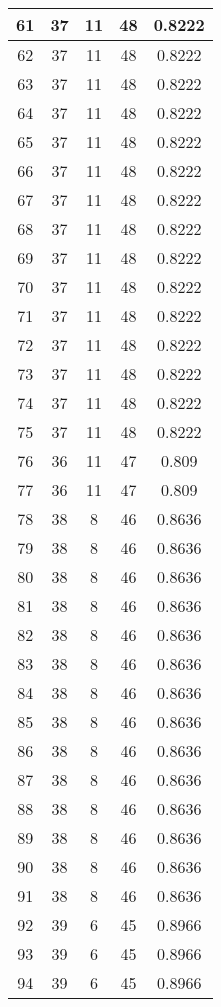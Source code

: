 \documentclass[letterpaper, 12pt]{article}
\begin{document}
\begin{longtable}{|c|c|c|c|c|}
\hline
61 & 37 & 11 & 48 & 0.8222 \\
\hline
62 & 37 & 11 & 48 & 0.8222 \\
\hline
63 & 37 & 11 & 48 & 0.8222 \\
\hline
64 & 37 & 11 & 48 & 0.8222 \\
\hline
65 & 37 & 11 & 48 & 0.8222 \\
\hline
66 & 37 & 11 & 48 & 0.8222 \\
\hline
67 & 37 & 11 & 48 & 0.8222 \\
\hline
68 & 37 & 11 & 48 & 0.8222 \\
\hline
69 & 37 & 11 & 48 & 0.8222 \\
\hline
70 & 37 & 11 & 48 & 0.8222 \\
\hline
71 & 37 & 11 & 48 & 0.8222 \\
\hline
72 & 37 & 11 & 48 & 0.8222 \\
\hline
73 & 37 & 11 & 48 & 0.8222 \\
\hline
74 & 37 & 11 & 48 & 0.8222 \\
\hline
75 & 37 & 11 & 48 & 0.8222 \\
\hline
76 & 36 & 11 & 47 & 0.809 \\
\hline
77 & 36 & 11 & 47 & 0.809 \\
\hline
78 & 38 & 8 & 46 & 0.8636 \\
\hline
79 & 38 & 8 & 46 & 0.8636 \\
\hline
80 & 38 & 8 & 46 & 0.8636 \\
\hline
81 & 38 & 8 & 46 & 0.8636 \\
\hline
82 & 38 & 8 & 46 & 0.8636 \\
\hline
83 & 38 & 8 & 46 & 0.8636 \\
\hline
84 & 38 & 8 & 46 & 0.8636 \\
\hline
85 & 38 & 8 & 46 & 0.8636 \\
\hline
86 & 38 & 8 & 46 & 0.8636 \\
\hline
87 & 38 & 8 & 46 & 0.8636 \\
\hline
88 & 38 & 8 & 46 & 0.8636 \\
\hline
89 & 38 & 8 & 46 & 0.8636 \\
\hline
90 & 38 & 8 & 46 & 0.8636 \\
\hline
91 & 38 & 8 & 46 & 0.8636 \\
\hline
92 & 39 & 6 & 45 & 0.8966 \\
\hline
93 & 39 & 6 & 45 & 0.8966 \\
\hline
94 & 39 & 6 & 45 & 0.8966 \\
\hline

\end{longtable}
\end{document}
